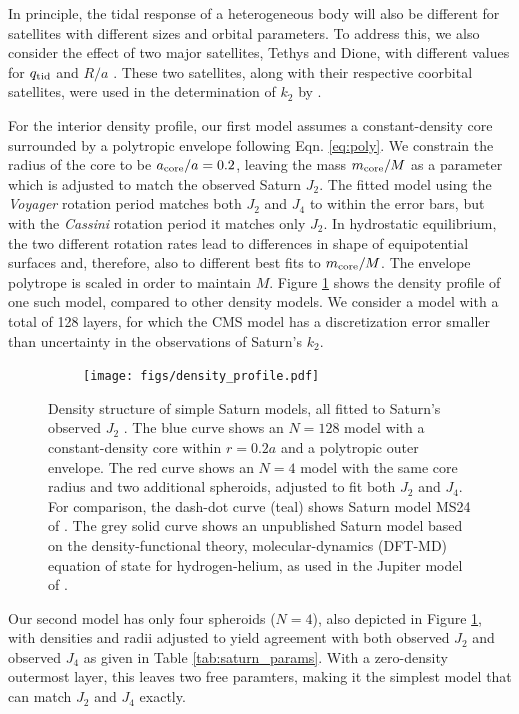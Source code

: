 In principle, the tidal response of a heterogeneous body will also be different for
satellites with different sizes and orbital parameters. To address this, we also
consider the effect of two major satellites, Tethys and Dione, with different values
for $q_{\rm tid}$ and $R/a$ \citep{archinal2011}. These two satellites, along with
their respective coorbital satellites, were used in the determination of $k_2$ by
\citet{lainey2016}.

For the interior density profile, our first model assumes a constant-density
core surrounded by a polytropic envelope following Eqn. \eqref{eq:poly}. We
constrain the radius of the core to be $a_{\rm core}/a=0.2$, leaving the mass
$m_{\rm core}/M$ as a parameter which is adjusted to match the observed Saturn
$J_2$.  The fitted model using the \textit{Voyager} rotation period matches
both $J_2$ and $J_4$ to within the error bars, but with the \textit{Cassini}
rotation period it matches only $J_2$.  In hydrostatic equilibrium, the two
different rotation rates lead to differences in shape of equipotential surfaces
and, therefore, also to different best fits to $m_{\rm core}/M$. The envelope
polytrope is scaled in order to maintain $M$. Figure
\ref{fig:density_structure} shows the density profile of one such model,
compared to other density models. We consider a model with a total of 128
layers, for which the CMS model has a discretization error \citep{wisdom2016}
smaller than uncertainty in the observations of Saturn's $k_2$.

\begin{figure}[h!]  
  \centering
    \texttt{[image: figs/density\_profile.pdf]} \caption{ 
Density structure of simple Saturn models, all fitted to Saturn's observed
$J_2$ \citep{Jacobson2006}.  The blue curve shows an $N=128$ model with a
constant-density core within $r=0.2 a$ and a polytropic outer envelope.  The
red curve shows an $N=4$ model with the same core radius and two additional
spheroids, adjusted to fit both $J_2$ and $J_4$.  For comparison, the dash-dot
curve (teal) shows Saturn model MS24 of \citet{gudkova1999}.  The grey solid
curve shows an unpublished Saturn model based on the density-functional theory,
molecular-dynamics (DFT-MD) equation of state for hydrogen-helium, as used in
the Jupiter model of \citet{hubbard2016}.
}
\label{fig:density_structure}
\end{figure}

Our second model has only four spheroids ($N=4$), also depicted in Figure
\ref{fig:density_structure}, with densities and radii adjusted to yield agreement
with both observed $J_2$ and observed $J_4$ as given in Table
\ref{tab:saturn_params}. With a zero-density outermost layer, this leaves two free
paramters, making it the simplest model that can match $J_2$ and $J_4$ exactly.

